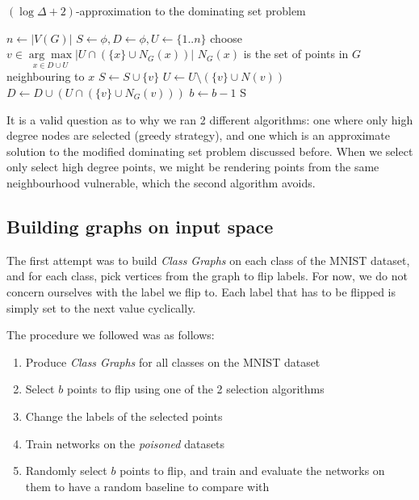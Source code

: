 \documentclass[12pt, oneside]{book}
\begin{document}
\begin{algorithm}[!h]
\caption{$(\log \Delta + 2)$-approximation to the dominating set problem}
\begin{algorithmic}[1]
    \State $n \gets |V(G)|$
    \State $S \gets \phi, D \gets \phi, U \gets \{1..n\}$   
        \State choose $v \in \underset{x \in D\cup U}{\arg\max}|{U\cap (\{x\}\cup N_G(x))}|$
        \Comment $N_G(x)$ is the set of points in $G$ neighbouring to $x$
        \State $S \gets S \cup \{v\}$
        \State $U \gets U \setminus (\{v\}\cup N(v))$
        \State $D \gets D\cup({U\cap (\{v\}\cup N_G(v))})$
        \State $b \gets b - 1$
    \EndWhile
    \State \Return S
\EndProcedure

\end{algorithmic}
\label{alg:log-delta}
\end{algorithm}

It is a valid question as to why we ran 2 different algorithms: one where only
high degree nodes are selected (greedy strategy), and one which is an
approximate solution to the modified dominating set problem discussed before.
When we select only select high degree points, we might be rendering points from
the same neighbourhood vulnerable, which the second algorithm avoids.

\subsection{Building graphs on input space}
The first attempt was to build \emph{Class Graphs} on each class of the MNIST
dataset, and for each class, pick vertices from the graph to flip labels. For
now, we do not concern ourselves with the label we flip to. Each label that has
to be flipped is simply set to the next value cyclically.

The procedure we followed was as follows:
\begin{enumerate}
    \item Produce \emph{Class Graphs } for all classes on the MNIST dataset
    \item Select $b$ points to flip using one of the 2 selection algorithms
    \item Change the labels of the selected points
    \item Train networks on the \emph{poisoned} datasets
    \item  Randomly select $b$ points to flip, and train and evaluate the
    networks on them to have a random baseline to compare with
\end{enumerate}
\end{document}
